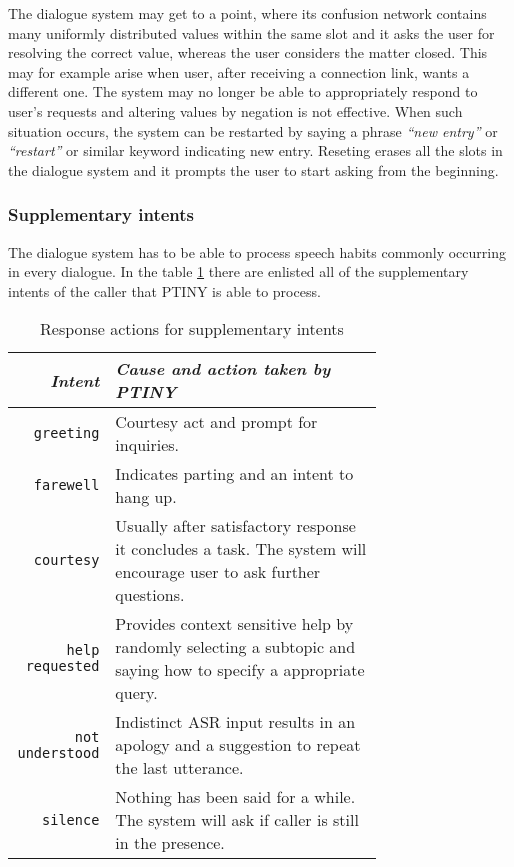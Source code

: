The dialogue system may get to a point, where its confusion network contains many uniformly distributed values within the same slot and it asks the user for resolving the correct value, whereas the user considers the matter closed.
This may for example arise when user, after receiving a connection link, wants a different one.
The system may no longer be able to appropriately respond to user's requests and altering values by negation is not effective.
When such situation occurs, the system can be restarted by saying a phrase \textit{``new entry''} or \textit{``restart''} or similar keyword indicating new entry.
Reseting erases all the slots in the dialogue system and it prompts the user to start asking from the beginning.

\subsubsection{Supplementary intents} %

The dialogue system has to be able to process speech habits commonly occurring in every dialogue.
In the table \ref{table:sup} there are enlisted all of the supplementary intents of the caller that PTINY is able to process.

\begin{table}[h]
\centering
\begin{tabular}{ r | p{0.73\linewidth} }
	\textit{Intent} & \textit{Cause and action taken by PTINY} \\ \hline
	\texttt{greeting} & Courtesy act and prompt for inquiries.\\
	\texttt{farewell} & Indicates parting and an intent to hang up.\\
	\texttt{courtesy} & Usually after satisfactory response it concludes a task. The system will encourage user to ask further questions. \\
	\texttt{help requested} & Provides context sensitive help by randomly selecting a subtopic and saying how to specify a appropriate query. \\
	\texttt{not understood} & Indistinct ASR input results in an apology and a suggestion to repeat the last utterance.\\ %
	\texttt{silence} & Nothing has been said for a while. The system will ask if caller is still in the presence. %
\end{tabular}
\caption[Response actions for supplementary intents]{Response actions for supplementary intents}
\label{table:sup}
\end{table}


